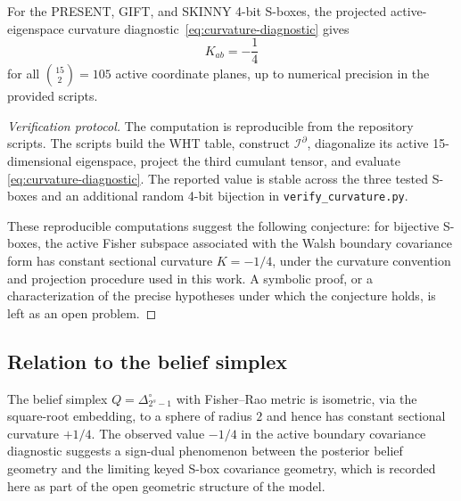 \begin{proposition}\label{prop:empirical-curv}
For the PRESENT, GIFT, and SKINNY 4-bit S-boxes, the projected active-eigenspace
curvature diagnostic~\eqref{eq:curvature-diagnostic} gives
\begin{equation}\label{eq:empirical-minus-quarter}
  K_{ab}=-\frac14
\end{equation}
for all $\binom{15}{2}=105$ active coordinate planes, up to numerical precision
in the provided scripts.
\end{proposition}

\begin{proof}[Verification protocol]
The computation is reproducible from the repository scripts.  The scripts build
the WHT table, construct $\mathcal I^{\partial}$, diagonalize its active
15-dimensional eigenspace, project the third cumulant tensor, and evaluate
\eqref{eq:curvature-diagnostic}.  The reported value is stable across the three
tested S-boxes and an additional random 4-bit bijection in
\texttt{verify\_curvature.py}.

These reproducible computations suggest the following conjecture: for bijective
S-boxes, the active Fisher subspace associated with the Walsh boundary
covariance form has constant sectional curvature $K=-1/4$, under the curvature
convention and projection procedure used in this work.  A symbolic proof, or a
characterization of the precise hypotheses under which the conjecture holds, is
left as an open problem.
\end{proof}



\subsection{Relation to the belief simplex}\label{subsec:curvature-belief}

The belief simplex $Q=\Delta_{2^s-1}^{\circ}$ with Fisher--Rao metric is
isometric, via the square-root embedding, to a sphere of radius $2$ and hence
has constant sectional curvature $+1/4$.  The observed value $-1/4$ in the
active boundary covariance diagnostic suggests a sign-dual phenomenon between
the posterior belief geometry and the limiting keyed S-box covariance geometry,
which is recorded here as part of the open geometric structure of the model.
